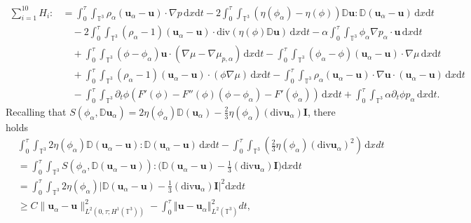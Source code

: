 \documentclass[reqno,a4paper,11pt]{amsart}
\theoremstyle{plain}
\numberwithin{equation}{section}
\newcommand{\bb}[1]{\mathbb{#1}}
\newcommand{\bbt}{\bb{T}}
\newcommand{\bu}{\mathbf{u}}
\renewcommand{\d}{\mathrm{d}}
\newcommand{\dx}{\d x}
\newcommand{\dt}{\d t}
\newcommand{\norm}[1]{\left\Vert #1 \right \Vert}
\begin{document}
				\begin{align}
					\label{mode54-2231}
					\nonumber\sum_{i=1}^{10}H_{i}:&=
					\int_0^\tau\int_{\mathbb{T}^{3}}  \rho_{\alpha}(\mathbf{u}_{\alpha}-\mathbf{u})\cdot \nabla p\,\dx\dt
					-2\int_0^\tau\int_{\mathbb{T}^{3}} (\eta(\phi_{\alpha})-\eta(\phi)) \mathbb{ D}\mathbf{u}: \mathbb{ D}(\mathbf{u}_{\alpha}-\mathbf{u})\,\dx\dt
					\\&\nonumber\quad-  2\int_0^\tau\int_{\mathbb{T}^{3}}(\rho_{\alpha}-1)  (\mathbf{u}_{\alpha}-\mathbf{u})\cdot \mathrm{div}(\eta(\phi)\mathbb{ D}\mathbf{u})\,\dx\dt
					-\nonumber \alpha \int_0^\tau\int_{\mathbb{T}^{3}}\phi_{\alpha}\nabla p_{\alpha}\cdot \mathbf{u}\,\dx\dt
					\\&
					\quad\nonumber+\int_0^\tau\int_{\mathbb{T}^{3}}(\phi-\phi_{\alpha})\mathbf{u} \cdot(\nabla\mu-\nabla\mu_{p,\alpha})\,\dx\dt -\int_0^\tau\int_{\mathbb{T}^{3}}(\phi_{\alpha}-\phi)(\mathbf{u}_{\alpha}-\mathbf{u})\cdot\nabla\mu\,\dx\dt
					\\&\quad
					\nonumber+ \int_0^\tau\int_{\mathbb{T}^{3}}(\rho_{\alpha}-1)  (\mathbf{u}_{\alpha}-\mathbf{u})\cdot (\phi\nabla\mu)\,\dx\dt
					-\int_0^\tau\int_{\mathbb{T}^{3}}\rho_{\alpha} (\mathbf{u}_{\alpha}-\mathbf{u})\cdot \nabla \mathbf{u} \cdot (\mathbf{u}_{\alpha}-\mathbf{u})\,\dx\dt
					\\&\quad-\int_0^\tau\int_{\mathbb{T}^{3}}\partial_{t}\phi (F'(\phi)-F''(\phi)(\phi-\phi_{\alpha})-F'(\phi_{\alpha}))\,\dx\dt
					+\int_0^\tau\int_{\mathbb{T}^{3}} \alpha\partial _{t}\phi p_{\alpha}\,\dx\dt.
				\end{align}
				Recalling that $S(\phi_{\alpha},\mathbb{ D}\mathbf{u}_{\alpha})=2\eta(\phi_{\alpha}) \mathbb{ D}( \mathbf{u}_{\alpha})-\frac{2}{3}\eta(\phi_{\alpha}) (\mathrm{div}  \mathbf{u}_{\alpha}) \mathbf{I}$, there holds
				\begin{align*}
					& \int_0^\tau\int_{\mathbb{T}^{3}} 2\eta(\phi_{\alpha}) \mathbb{ D}(\mathbf{u}_{\alpha}-\mathbf{u}): \mathbb{ D}(\mathbf{u}_{\alpha}-\mathbf{u})\,\dx\dt
					-\int_0^{\tau}\int_{\mathbb{T}^{3}}  (\frac{2}{3}\eta(\phi_{\alpha}) (\mathrm{div} \mathbf{u}_{\alpha})^2)\, \mathrm{d} xdt
					\\&=\int_0^\tau\int_{\mathbb{T}^{3}} S(\phi_{\alpha},\mathbb{ D}(\mathbf{u}_{\alpha}-\mathbf{u})):
					\big( \mathbb{ D}( \mathbf{u}_{\alpha}-\mathbf{u})-\frac{1}{3} (\mathrm{div}  \mathbf{u}_{\alpha}) \mathbf{I}\big)\dx\dt
					\nonumber\\&=\int_0^\tau\int_{\mathbb{T}^{3}} 2\eta(\phi_{\alpha})|
					\mathbb{ D}( \mathbf{u}_{\alpha}-\mathbf{u})-\frac{1}{3} (\mathrm{div}  \mathbf{u}_{\alpha}) \mathbf{I}\big|^{2}\dx\dt\nonumber
					\\&\geq C \| \mathbf{u}_{\alpha}-\mathbf{u}\|_{L^2(0,\tau;H^{1}(\mathbb{T}^{3}))}^{2}-\int_0^{\tau}\norm{\bu-\bu_\alpha}_{L^2(\bbt^3)}^{2}dt,
				\end{align*}
\end{document}
